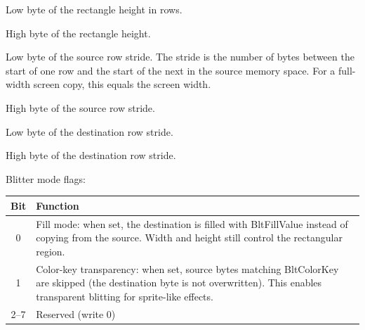 
Low byte of the rectangle height in rows.


High byte of the rectangle height.



Low byte of the source row stride.  The stride is the number of bytes
between the start of one row and the start of the next in the source
memory space.  For a full-width screen copy, this equals the screen width.


High byte of the source row stride.



Low byte of the destination row stride.


High byte of the destination row stride.



Blitter mode flags:


\begin{center}
\small
\begin{tabular}{@{}cp{10cm}@{}}
\toprule
\textbf{Bit} & \textbf{Function} \\
\midrule
0 & Fill mode: when set, the destination is filled with BltFillValue
    instead of copying from the source.  Width and height still control
    the rectangular region. \\
1 & Color-key transparency: when set, source bytes matching BltColorKey
    are skipped (the destination byte is not overwritten).  This enables
    transparent blitting for sprite-like effects. \\
2--7 & Reserved (write 0) \\
\bottomrule
\end{tabular}
\end{center}

